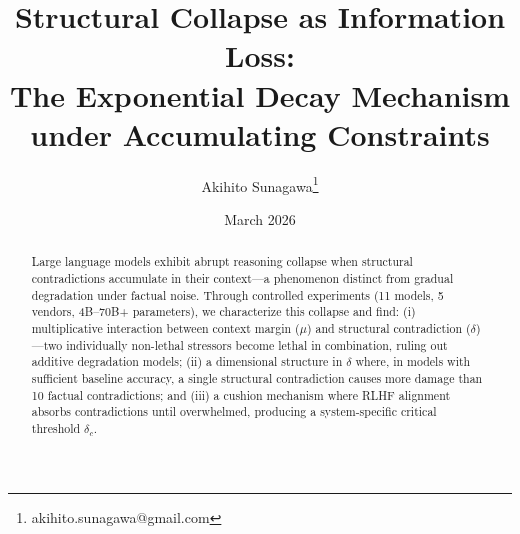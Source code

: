 \documentclass[11pt,a4paper]{article}
\title{Structural Collapse as Information Loss:\\
The Exponential Decay Mechanism under Accumulating Constraints}
\author{Akihito Sunagawa\thanks{akihito.sunagawa@gmail.com}}
\date{March 2026}
\begin{document}
\maketitle

\begin{abstract}
Large language models exhibit abrupt reasoning collapse when structural contradictions accumulate in their context---a phenomenon distinct from gradual degradation under factual noise. Through controlled experiments (11 models, 5 vendors, 4B--70B+ parameters), we characterize this collapse and find: (i) multiplicative interaction between context margin ($\mu$) and structural contradiction ($\delta$)---two individually non-lethal stressors become lethal in combination, ruling out additive degradation models; (ii) a dimensional structure in $\delta$ where, in models with sufficient baseline accuracy, a single structural contradiction causes more damage than 10 factual contradictions; and (iii) a cushion mechanism where RLHF alignment absorbs contradictions until overwhelmed, producing a system-specific critical threshold $\delta_c$.


\end{abstract}
\end{document}
